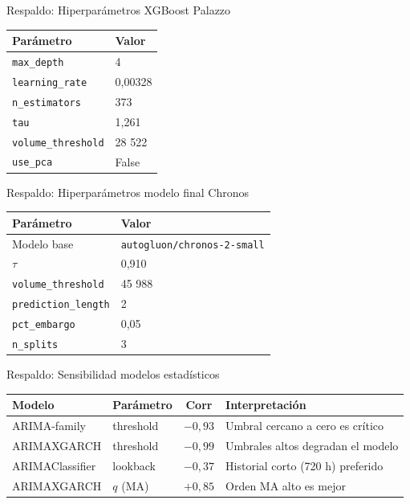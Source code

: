 \documentclass[aspectratio=169, spanish, 12pt]{beamer}
\begin{document}
\begin{frame}[noframenumbering]{Respaldo: Hiperparámetros XGBoost Palazzo}
  \begin{tabular}{ll}
    \toprule
    \textbf{Parámetro} & \textbf{Valor} \\
    \midrule
    \texttt{max\_depth}        & 4       \\
    \texttt{learning\_rate}    & 0,00328 \\
    \texttt{n\_estimators}     & 373     \\
    \texttt{tau}               & 1,261   \\
    \texttt{volume\_threshold} & 28 522  \\
    \texttt{use\_pca}          & False   \\
    \bottomrule
  \end{tabular}
\end{frame}

\begin{frame}[noframenumbering]{Respaldo: Hiperparámetros modelo final Chronos}
  \begin{tabular}{ll}
    \toprule
    \textbf{Parámetro} & \textbf{Valor} \\
    \midrule
    Modelo base                 & \texttt{autogluon/chronos-2-small} \\
    $\tau$                      & 0,910   \\
    \texttt{volume\_threshold}  & 45 988  \\
    \texttt{prediction\_length} & 2       \\
    \texttt{pct\_embargo}       & 0,05    \\
    \texttt{n\_splits}          & 3       \\
    \bottomrule
  \end{tabular}
\end{frame}

\begin{frame}[noframenumbering]{Respaldo: Sensibilidad modelos estadísticos}
  \begin{tabular}{llcp{5cm}}
    \toprule
    \textbf{Modelo} & \textbf{Parámetro} & \textbf{Corr} & \textbf{Interpretación} \\
    \midrule
    ARIMA-family    & threshold   & $-0{,}93$ & Umbral cercano a cero es crítico \\
    ARIMAXGARCH     & threshold   & $-0{,}99$ & Umbrales altos degradan el modelo \\
    ARIMAClassifier & lookback    & $-0{,}37$ & Historial corto (720 h) preferido \\
    ARIMAXGARCH     & $q$ (MA)    & $+0{,}85$ & Orden MA alto es mejor \\
    \bottomrule
  \end{tabular}
\end{frame}
\end{document}
